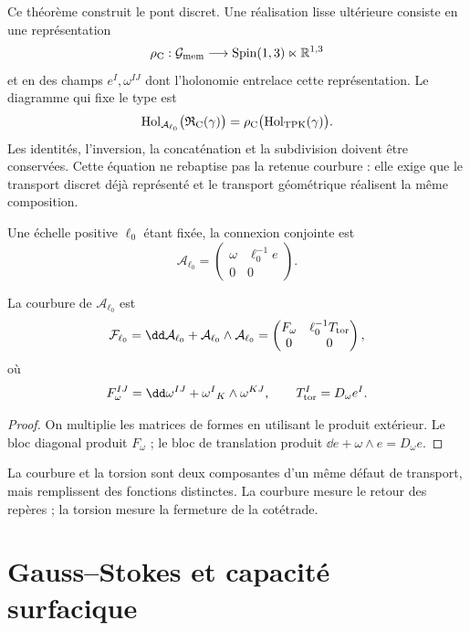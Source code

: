 Ce théorème construit le pont discret. Une réalisation lisse ultérieure
consiste en une représentation
\[
 \rho_{\rm C}:\mathcal G_{\rm mem}
 \longrightarrow\operatorname{Spin}(1,3)\ltimes\mathbb R^{1,3}
\]
et en des champs \(e^I,\omega^{IJ}\) dont l'holonomie entrelace cette représentation.
Le diagramme qui fixe le type est
\[
 \operatorname{Hol}_{\mathcal A_{\ell_0}}
   \bigl(\mathfrak R_{\rm C}(\gamma)\bigr)
 =
 \rho_{\rm C}\bigl(\operatorname{Hol}_{\rm TPK}(\gamma)\bigr).
\]
Les identités, l'inversion, la concaténation et la subdivision doivent être conservées. Cette
équation ne rebaptise pas la retenue courbure : elle exige que le transport
discret déjà représenté et le transport géométrique réalisent la même composition.

Une échelle positive \(\ell_0\) étant fixée, la connexion conjointe est
\[
 \mathcal A_{\ell_0}
 =
 \begin{pmatrix}
 \omega&\ell_0^{-1}e\\
 0&0
 \end{pmatrix}.
\]

\begin{proposition}
\label{prop:curvatura-conjunta-cartan-rev6}
La courbure de \(\mathcal A_{\ell_0}\) est
\[
 \mathcal F_{\ell_0}
 =\dd\mathcal A_{\ell_0}
  +\mathcal A_{\ell_0}\wedge\mathcal A_{\ell_0}
 =
 \begin{pmatrix}
 F_\omega&\ell_0^{-1}T_{\rm tor}\\
 0&0
 \end{pmatrix},
\]
où
\[
 F_\omega^{IJ}
 =\dd\omega^{IJ}+\omega^I{}_K\wedge\omega^{KJ},
 \qquad
 T_{\rm tor}^{I}=D_\omega e^I.
\]
\end{proposition}

\begin{proof}
On multiplie les matrices de formes en utilisant le produit extérieur. Le
bloc diagonal produit \(F_\omega\) ; le bloc de translation produit
\(\dd e+\omega\wedge e=D_\omega e\).
\end{proof}

La courbure et la torsion sont deux composantes d'un même défaut de transport,
mais remplissent des fonctions distinctes. La courbure mesure le retour des repères ;
la torsion mesure la fermeture de la cotétrade.

\section{Gauss--Stokes et capacité surfacique}

